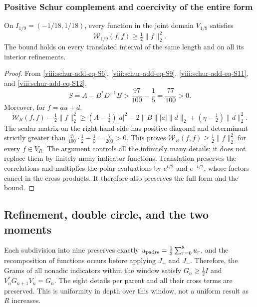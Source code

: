 \subsubsection{Positive Schur complement and coercivity of the entire form}
\label{viii:schur-add-sub-348}

\begin{theorem}
\label{viii:schur-add:coercividad-ventana}
On \(I_{1/9}=(-1/18,1/18)\), every function in the joint domain
\(V_{1/9}\) satisfies
\[
\mathscr W_{1/9}(f,f)\geq\tfrac12\|f\|_2^2.
\]
The bound holds on every translated interval of the same length and on all
its interior refinements.
\end{theorem}
\begin{proof}
From \eqref{viii:schur-add-eq-S6}, \eqref{viii:schur-add-eq-S9},
\eqref{viii:schur-add-eq-S11}, and \eqref{viii:schur-add-eq-S12},
\begin{equation}
S=A-B^*D^{-1}B>\frac{97}{100}-\frac15=\frac{77}{100}>0.
\label{viii:schur-add-display-29}
\end{equation}
Moreover, for \(f=au+d\),
\begin{equation}
\mathscr W_R(f,f)-\tfrac12\|f\|_2^2
\geq(A-\tfrac12)|a|^2
-2\|B\||a|\|d\|_2+(\eta-\tfrac12)\|d\|_2^2.
\label{viii:schur-add-display-30}
\end{equation}
The scalar matrix on the right-hand side has positive diagonal and
determinant strictly greater than
\(\tfrac{47}{100}\cdot\tfrac12-\tfrac15=\tfrac7{200}>0\).
This proves \(\mathscr W_R(f,f)\geq\tfrac12\|f\|_2^2\)
for every \(f\in V_R\). The argument controls all the infinitely many
details; it does not replace them by finitely many indicator functions. Translation
preserves the correlations and multiplies the polar evaluations
by \(e^{t/2}\) and \(e^{-t/2}\), whose factors cancel in the cross products.
It therefore also preserves the full form and the bound.
\end{proof}

\subsection{Refinement, double circle, and the two moments}
\label{viii:schur-add-sub-367}

Each subdivision into nine preserves exactly
\(u_{\rm padre}=\tfrac13\sum_{r=0}^8u_r\), and the recomposition of
functions occurs before applying \(J_+\) and \(J_-\). Therefore,
the Grams of all nonadic indicators within the window
satisfy \(G_n\geq\tfrac12 I\) and
\(V_n^*G_{n+1}V_n=G_n\). The eight details per parent and
all their cross terms are preserved. This is uniformity in depth over this window,
not a uniform result as \(R\) increases.

